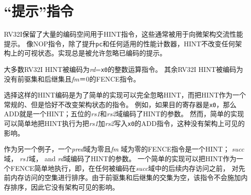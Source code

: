 \section{“提示”指令}
\label{sec:rv32i-hints}

RV32I保留了大量的编码空间用于HINT指令，这些通常被用于向微架构交流性能提示。
像NOP指令，除了提升{\tt pc}和任何适用的性能计数器，HINT不改变任何架构上的可视状态。实现总是被允许忽略已编码的提示。

大多数RV32I HINT被编码为{\em rd}={\tt x0}的整数运算指令。
其余RV32I HINT被编码为没有前驱集和后继集且{\em fm}＝0的FENCE指令。

\begin{commentary}
选择这样的HINT编码是为了简单的实现可以完全忽略HINT，而把HINT作为一个常规的、但是恰好不改变架构状态的指令。
例如，如果目的寄存器是{\tt x0}，那么ADD就是一个HINT；五位的{\em rs1}和{\em rs2}域编码了HINT的参数。
然而，简单的实现可以简单地把HINT执行为把{\em rs1}加{\em rs2}写入{\tt x0}的ADD指令，这种没有架构上可见的影响。

作为另一个例子，一个{\em pred}域为零且{\em fm} 域为零的FENCE指令是一个HINT；
{\em succ}域， {\em rs1}域， and {\em rd}域编码了HINT的参数。
一个简单的实现可以把HINT作为一个FENCE简单地执行，即，在任何被编码在{\em succ}域中的后续内存访问之前，
对先前内存访问的空集进行排序。由于前驱集和后继集的交集为空，该指令不会施加内存排序，因此它没有架构可见的影响。
\end{commentary}

